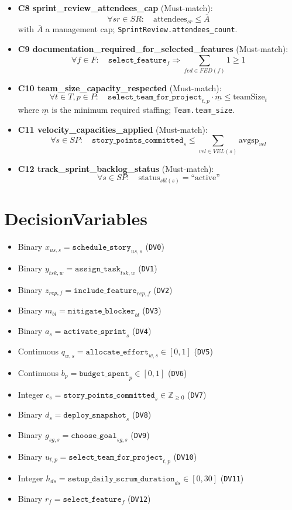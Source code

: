 \documentclass[11pt,a4paper]{article}
\begin{document}
\begin{itemize}[leftmargin=2em]
  \item \textbf{C8 sprint\_review\_attendees\_cap} (Must-match):
  \[
    \forall sr\in SR:\quad \text{attendees}_{sr} \le \overline{A}
  \]
  with $\overline{A}$ a management cap; \texttt{SprintReview.attendees\_count}.
  
  \item \textbf{C9 documentation\_required\_for\_selected\_features} (Must-match):
  \[
    \forall f\in F:\quad \texttt{select\_feature}_{f} \Rightarrow \sum_{fed\in FED(f)} 1 \ge 1
  \]
  
  \item \textbf{C10 team\_size\_capacity\_respected} (Must-match):
  \[
    \forall t\in T, p\in P:\quad \texttt{select\_team\_for\_project}_{t,p}\cdot \underline{m} \le \text{teamSize}_{t}
  \]
  where $\underline{m}$ is the minimum required staffing; \texttt{Team.team\_size}.
  
  \item \textbf{C11 velocity\_capacities\_applied} (Must-match):
  \[
    \forall s\in SP:\quad \texttt{story\_points\_committed}_{s} \le \sum_{vel\in VEL(s)} \text{avgsp}_{vel}
  \]
  
  \item \textbf{C12 track\_sprint\_backlog\_status} (Must-match):
  \[
    \forall s\in SP:\quad \text{status}_{sbl(s)}=\text{``active''}
  \]
\end{itemize}

\section{DecisionVariables}
\begin{itemize}[leftmargin=2em]
  \item Binary $x_{us,s}=\texttt{schedule\_story}_{us,s}$ (\texttt{DV0})
  \item Binary $y_{tsk,w}=\texttt{assign\_task}_{tsk,w}$ (\texttt{DV1})
  \item Binary $z_{rep,f}=\texttt{include\_feature}_{rep,f}$ (\texttt{DV2})
  \item Binary $m_{bl}=\texttt{mitigate\_blocker}_{bl}$ (\texttt{DV3})
  \item Binary $a_{s}=\texttt{activate\_sprint}_{s}$ (\texttt{DV4})
  \item Continuous $q_{w,s}=\texttt{allocate\_effort}_{w,s}\in[0,1]$ (\texttt{DV5})
  \item Continuous $b_{p}=\texttt{budget\_spent}_{p}\in[0,1]$ (\texttt{DV6})
  \item Integer $c_{s}=\texttt{story\_points\_committed}_{s}\in\mathbb{Z}_{\ge0}$ (\texttt{DV7})
  \item Binary $d_{s}=\texttt{deploy\_snapshot}_{s}$ (\texttt{DV8})
  \item Binary $g_{sg,s}=\texttt{choose\_goal}_{sg,s}$ (\texttt{DV9})
  \item Binary $u_{t,p}=\texttt{select\_team\_for\_project}_{t,p}$ (\texttt{DV10})
  \item Integer $h_{ds}=\texttt{setup\_daily\_scrum\_duration}_{ds}\in[0,30]$ (\texttt{DV11})
  \item Binary $r_{f}=\texttt{select\_feature}_{f}$ (\texttt{DV12})
\end{itemize}
\end{document}
